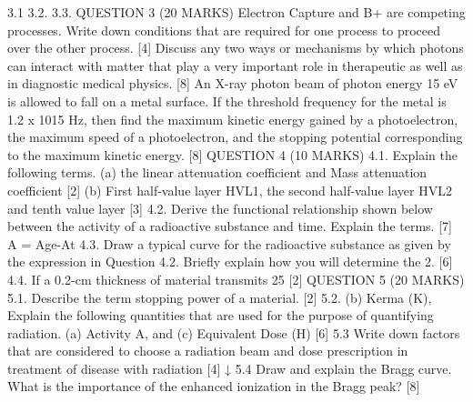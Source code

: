 \documentclass[addpoints]{exam}
\begin{document}
\begin{questions}
\begin{parts}
3.1
3.2.
3.3.
QUESTION 3 (20 MARKS)
Electron Capture and B+ are competing processes. Write down conditions that are required for one process to proceed over the other process.
[4] Discuss any two ways or mechanisms by which photons can interact with matter that play a very important role in therapeutic as well as in diagnostic medical physics. [8] An X-ray photon beam of photon energy 15 eV is allowed to fall on a metal surface. If the threshold frequency for the metal is 1.2 x 1015 Hz, then find the maximum kinetic energy gained by a photoelectron, the maximum speed of a photoelectron, and the stopping potential corresponding to the maximum kinetic energy.
[8]
QUESTION 4 (10 MARKS)
4.1.
Explain the following terms.
(a) the linear attenuation coefficient and Mass attenuation coefficient
[2]
(b) First half-value layer HVL1, the second half-value layer HVL2 and tenth value layer [3]
4.2.
Derive the functional relationship shown below between the activity of a radioactive substance and time. Explain the terms.
[7]
A =
Age-At
4.3.
Draw a typical curve for the radioactive substance as given by the expression in Question 4.2. Briefly explain how you will determine the 2.
[6]
4.4.
If a 0.2-cm thickness of material transmits 25%
[2]
QUESTION 5 (20 MARKS)
5.1.
Describe the term stopping power of a material.
[2]
5.2.
(b) Kerma (K),
Explain the following quantities that are used for the purpose of quantifying radiation. (a) Activity A, and (c) Equivalent Dose (H)
[6]
5.3
Write down factors that are considered to choose a radiation beam and dose prescription in treatment of disease with radiation
[4]
↓
5.4
Draw and explain the Bragg curve. What is the importance of the enhanced ionization in the Bragg peak?
[8]
\end{parts}

\end{questions}
\end{document}
